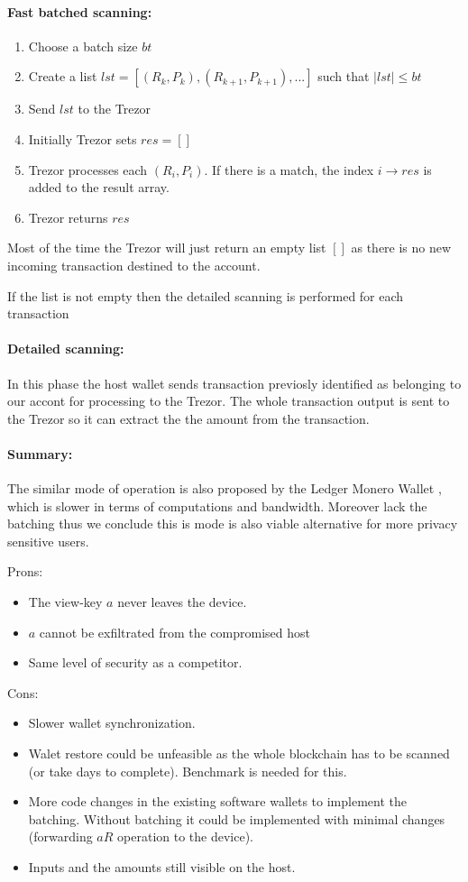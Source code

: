 \documentclass[]{article}
\begin{document}
\paragraph{Fast batched scanning:}
\begin{enumerate}
	\item Choose a batch size $bt$
	\item Create a list $lst = [(R_k, P_k), (R_{k+1}, P_{k+1}), ...]$ such that $|lst| \leq bt$
	\item Send $lst$ to the Trezor
	\item Initially Trezor sets $res = []$
	\item Trezor processes each $(R_i, P_i)$. If there is a match, the index $i \rightarrow res$ is added to the result array.
	\item Trezor returns $res$ 
\end{enumerate}
Most of the time the Trezor will just return an empty list $[]$ as there is no new incoming transaction destined to the account. 

If the list is not empty then the detailed scanning is performed for each transaction

\paragraph{Detailed scanning:} In this phase the host wallet sends transaction previosly identified as belonging to our accont for processing to the Trezor. The whole transaction output is sent to the Trezor so it can extract the the amount from the transaction.

\paragraph{Summary:}
The similar mode of operation is also proposed by the Ledger Monero Wallet \cite{ledger_doc}, which is slower in terms of computations and bandwidth. Moreover lack the batching thus we conclude this is mode is also viable alternative for more privacy sensitive users.

\noindent Prons:
\begin{itemize}
	\item The view-key $a$ never leaves the device.
	\item $a$ cannot be exfiltrated from the compromised host
	\item Same level of security as a competitor.
\end{itemize}

\noindent Cons:
\begin{itemize}
	\item Slower wallet synchronization.
	\item Walet restore could be unfeasible as the whole blockchain has to be scanned (or take days to complete). Benchmark is needed for this.
	\item More code changes in the existing software wallets to implement the batching. Without batching it could be implemented with minimal changes (forwarding $aR$ operation to the device).
	\item Inputs and the amounts still visible on the host.
\end{itemize}
\end{document}
